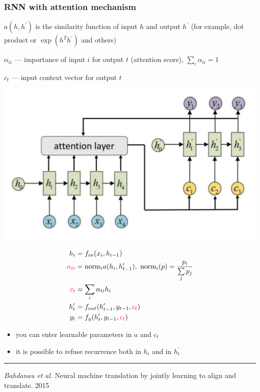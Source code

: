 \documentclass[fullscreen=true, bookmarks=true, hyperref={pdfencoding=unicode}]{beamer}
\begin{document}
\begin{frame}
  \frametitle{RNN with attention mechanism}

   $a(h, h^\prime)$ is the similarity function of input $h$ and output $h^\prime$
   (for example, dot product or $\exp(h^T h^\prime)$ and others)

   \vspace{0.5cm}
   $\alpha_{ti}$ — importance of input $i$ for output $t$ (attention score), $\sum\limits_i \alpha_{ti} = 1$

   $c_t$ — input context vector for output $t$
  \begin{center}
    \includegraphics[keepaspectratio,
                   width=.6\paperwidth]{seq2seq_attention.png}
  \end{center}
\end{frame}



\begin{frame}

  \begin{align*}
    h_i &= f_{in}(x_i, h_{i-1}) \\
    {\color{red}\alpha_{ti}} &= \text{norm}_i a(h_i, h^\prime_{t-1}),\text{ norm}_i(p) = \frac{p_i}{\sum\limits_j p_j} \\
    {\color{red}c_t} &= \sum_i \alpha_{ti} h_i \\
   h_t^\prime &= f_{out} (h^\prime_{t-1}, y_{t-1}, {\color{red}c_t}) \\
   y_t &= f_{y}(h_t^\prime, y_{t-1}, {\color{red}c_t})
  \end{align*}

  \begin{itemize}
    \item you can enter learnable parameters in $a$ and $c_t$
    \item it is possible to refuse recurrence both in $h_i$ and in $h_t^\prime$
  \end{itemize}

  \noindent\rule{8cm}{0.4pt}
  
  {\small
  {\it Bahdanau et al.} Neural machine translation by jointly learning to align and translate. 2015}
\end{frame}
\end{document}
